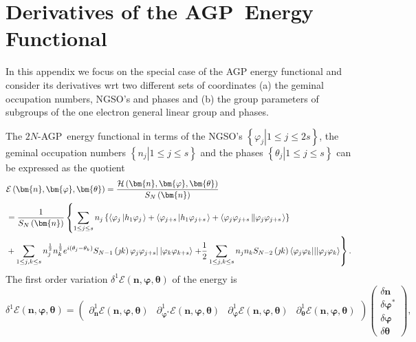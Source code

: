 \documentclass{preprint}
\begin{document}
\section{Derivatives of the AGP\ Energy Functional\label{variational}}

In this appendix we focus on the special case of the AGP energy functional
and consider its derivatives wrt two different sets of coordinates (a) the
geminal occupation numbers, NGSO's and phases and (b) the group parameters
of subgroups of the one electron general linear group and phases.

The $2N$-AGP\ energy functional in terms of the NGSO's $\left\{ \left.
\varphi_{j}\right\vert 1\leq j\leq2s\right\} $, the geminal occupation
numbers $\left\{ \left. n_{j}\right\vert 1\leq j\leq s\right\} $ and the
phases $\left\{ \left. \theta_{j}\right\vert 1\leq j\leq s\right\} $ can be
expressed as the quotient%
\begin{align}
& \mathcal{E}\left( \bm{n},\bm{\varphi},\bm{\theta}\right) =\frac {\mathcal{H%
}\left( \bm{n},\bm{\varphi},\bm{\theta}\right) }{S_{N}\left( \bm{n}\right) }
\notag \\
& =\frac{1}{S_{N}\left( \bm{n}\right) }\left\{ \sum_{1\leq j\leq
s}n_{j}\left\{ \left\langle \varphi_{j}\left\vert h_{1}\varphi_{j}\right.
\right\rangle +\left\langle \varphi_{j+s}\left\vert
h_{1}\varphi_{j+s}\right. \right\rangle +\left\langle
\varphi_{j}\varphi_{j+s}\left\Vert \varphi _{j}\varphi_{j+s}\right.
\right\rangle \right\} \right.  \notag \\
& +\sum_{1\leq j,k\leq s}n_{j}^{\frac{1}{2}}n_{k}^{\frac{1}{2}}e^{i\left(
\theta_{j}-\theta_{k}\right) }S_{N-1}\left( \jmath k\right) \varphi
_{j}\varphi_{j+s}|\left\vert \varphi_{k}\varphi_{k+s}\right\rangle \left. +%
\frac{1}{2}\sum_{1\leq j,k\leq s}n_{j}n_{k}S_{N-2}\left( \jmath k\right)
\left\langle \varphi_{j}\varphi_{k}|||\varphi_{j}\varphi_{k}\right\rangle
\right\} .
\end{align}
The first order variation $\delta^{1}\mathcal{E}\left( \bm{n},\bm{\varphi},%
\bm{\theta}\right) $ of the energy is
\begin{equation}
\delta^{1}\mathcal{E}\left( \bm{n},\bm{\varphi},\bm{\theta }\right) =\left(
\begin{array}{cccc}
\partial_{\bm{n}}^{1}\mathcal{E}\left( \bm{n},\bm{\varphi },\bm{\theta}%
\right) & \partial_{\bm{\varphi}^{\ast}}^{1}\mathcal{E}\left( \bm{n},%
\bm{\varphi},\bm{\theta}\right) & \partial_{\bm{\varphi}}^{1}\mathcal{E}%
\left( \bm{n},\bm{\varphi },\bm{\theta}\right) & \partial_{\bm{\theta}}^{1}%
\mathcal{E}\left( \bm{n},\bm{\varphi},\bm{\theta}\right)%
\end{array}
\right) \left(
\begin{array}{c}
\delta\bm{n} \\
\delta\bm{\varphi}^{\ast} \\
\delta\bm{\varphi} \\
\delta\bm{\theta}%
\end{array}
\right) ,
\end{equation}
\end{document}
